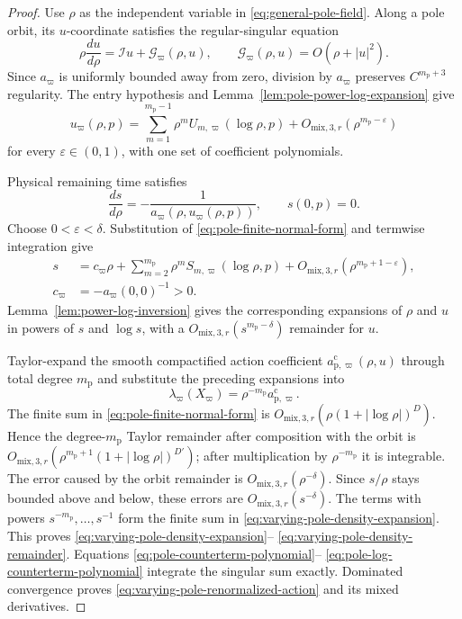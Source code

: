 \documentclass[11pt]{amsart}
\numberwithin{equation}{section}
\theoremstyle{definition}
\theoremstyle{remark}
\begin{document}
\begin{proof}
Use $\rho$ as the independent variable in
\eqref{eq:general-pole-field}.  Along a pole orbit, its $u$-coordinate
satisfies the regular-singular equation
\begin{equation}\label{eq:pole-regular-singular-equation}
 \rho\frac{du}{d\rho}
 =\mathcal Iu+\mathcal G_\varpi(\rho,u),
 \qquad
 \mathcal G_\varpi(\rho,u)=O(\rho+|u|^2).
\end{equation}
Since $a_\varpi$ is uniformly bounded away from zero, division by
$a_\varpi$ preserves $C^{m_{\mathrm p}+3}$ regularity.  The entry hypothesis and
Lemma~\ref{lem:pole-power-log-expansion} give
\begin{equation}\label{eq:pole-finite-normal-form}
 u_\varpi(\rho,p)
 =\sum_{m=1}^{m_{\mathrm p}-1}
     \rho^mU_{m,\varpi}(\log\rho,p)
  +O_{\mathrm{mix},3,r}(\rho^{m_{\mathrm p}-\varepsilon})
\end{equation}
for every $\varepsilon\in(0,1)$, with one set of coefficient polynomials.

Physical remaining time satisfies
\begin{equation}\label{eq:pole-phase-rho-equation}
 \frac{ds}{d\rho}
 =-\frac1{a_\varpi(\rho,u_\varpi(\rho,p))},
 \qquad s(0,p)=0.
\end{equation}
Choose $0<\varepsilon<\delta$.  Substitution of
\eqref{eq:pole-finite-normal-form} and termwise integration give
\[
 \begin{aligned}
 s&=c_\varpi\rho
   +\sum_{m=2}^{m_{\mathrm p}}
       \rho^mS_{m,\varpi}(\log\rho,p)
   +O_{\mathrm{mix},3,r}
       (\rho^{m_{\mathrm p}+1-\varepsilon}),\\
 c_\varpi&=-a_\varpi(0,0)^{-1}>0.
 \end{aligned}
\]
Lemma~\ref{lem:power-log-inversion} gives the corresponding expansions of
$\rho$ and $u$ in powers of $s$ and $\log s$, with a
$O_{\mathrm{mix},3,r}(s^{m_{\mathrm p}-\delta})$ remainder for $u$.

Taylor-expand the smooth compactified action coefficient
$a_{\mathrm p,\varpi}^{\mathrm c}(\rho,u)$ through total degree
$m_{\mathrm p}$ and
substitute the preceding expansions into
\[
 \lambda_\varpi(X_\varpi)
 =\rho^{-m_{\mathrm p}}a_{\mathrm p,\varpi}^{\mathrm c}.
\]
The finite sum in \eqref{eq:pole-finite-normal-form} is
$O_{\mathrm{mix},3,r}(\rho(1+|\log\rho|)^D)$.  Hence the
degree-$m_{\mathrm p}$ Taylor remainder after
composition with the orbit is
$O_{\mathrm{mix},3,r}
 (\rho^{m_{\mathrm p}+1}(1+|\log\rho|)^{D'})$; after multiplication
by $\rho^{-m_{\mathrm p}}$ it is integrable.  The error caused by the orbit remainder
is $O_{\mathrm{mix},3,r}(\rho^{-\delta})$.  Since $s/\rho$ stays bounded
above and below, these errors are $O_{\mathrm{mix},3,r}(s^{-\delta})$.
The terms with powers $s^{-m_{\mathrm p}},\ldots,s^{-1}$ form the finite sum in
\eqref{eq:varying-pole-density-expansion}.  This proves
\eqref{eq:varying-pole-density-expansion}--
\eqref{eq:varying-pole-density-remainder}.  Equations
\eqref{eq:pole-counterterm-polynomial}--
\eqref{eq:pole-log-counterterm-polynomial} integrate the singular sum
exactly.  Dominated convergence proves
\eqref{eq:varying-pole-renormalized-action} and its mixed derivatives.


\end{proof}
\end{document}
